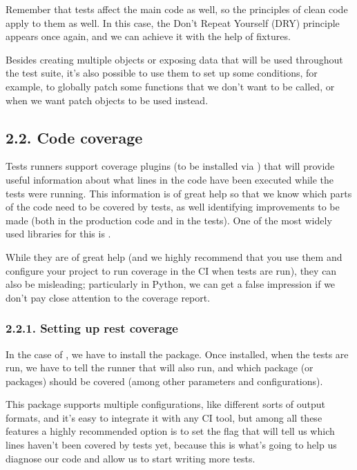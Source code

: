 \documentclass[a4paper,10pt,english]{sphinxmanual}
\begin{document}
Remember that tests affect the main code as well, so the principles of clean code apply to
them as well. In this case, the Don’t Repeat Yourself (DRY) principle appears once again, and we can achieve
it with the help of  fixtures.

Besides creating multiple objects or exposing data that will be used throughout the test
suite, it’s also possible to use them to set up some conditions, for example, to globally patch
some functions that we don’t want to be called, or when we want patch objects to be used
instead.


\subsection{2.2. Code coverage}
\label{\detokenize{chapters/8_unit_testing/index:code-coverage}}
Tests runners support coverage plugins (to be installed via ) that will provide useful
information about what lines in the code have been executed while the tests were running.
This information is of great help so that we know which parts of the code need to be
covered by tests, as well identifying improvements to be made (both in the production code
and in the tests). One of the most widely used libraries for this is .

While they are of great help (and we highly recommend that you use them and configure
your project to run coverage in the CI when tests are run), they can also be misleading;
particularly in Python, we can get a false impression if we don’t pay close attention to the
coverage report.


\subsubsection{2.2.1. Setting up rest coverage}
\label{\detokenize{chapters/8_unit_testing/index:setting-up-rest-coverage}}
In the case of , we have to install the  package. Once installed, when the tests are
run, we have to tell the  runner that  will also run, and which package (or packages)
should be covered (among other parameters and configurations).

This package supports multiple configurations, like different sorts of output formats, and
it’s easy to integrate it with any CI tool, but among all these features a highly recommended
option is to set the flag that will tell us which lines haven’t been covered by tests yet,
because this is what’s going to help us diagnose our code and allow us to start writing more
tests.
\end{document}
